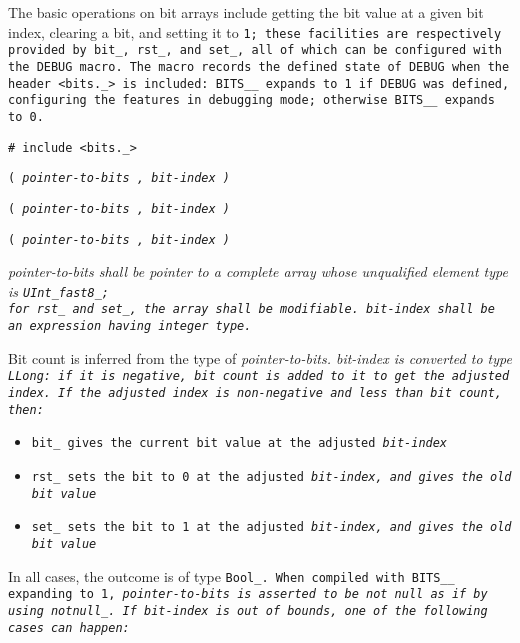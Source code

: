 The basic operations on bit arrays include getting the bit value
at a given bit index, clearing a bit, and setting it to \tt{1};
these facilities are respectively provided by \tt{bit_}, \tt{rst_},
and \tt{set_}, all of which can be configured with the \tt{DEBUG} macro.
The macro  records the \tt{defined} state of \tt{DEBUG}
when the header \tt{<bits._>} is included: \tt{BITS__} expands
to \tt{1} if \tt{DEBUG} was defined, configuring the features
in debugging mode; otherwise \tt{BITS__} expands to \tt{0}.


\tt{# include <bits._>}

 \tt{(} \it{pointer-to-bits} \tt{,} \it{bit-index} \tt{)}

 \tt{(} \it{pointer-to-bits} \tt{,} \it{bit-index} \tt{)}

 \tt{(} \it{pointer-to-bits} \tt{,} \it{bit-index} \tt{)}


\it{pointer-to-bits} shall be pointer to a complete array whose unqualified
element type is \tt{UInt_fast8_};\\for \tt{rst_} and \tt{set_}, the array shall be modifiable.
\it{bit-index} shall be an expression having integer type.


Bit count is inferred from the type of \it{pointer-to-bits}.
\it{bit-index} is converted to type \tt{LLong}:
if it is negative, bit count is added to it to get the adjusted index.
If the adjusted index is non-negative and less than bit count, then:

\begin{itemize}[nosep]

\item \tt{bit_} gives the current bit value at the adjusted \it{bit-index}

\item \tt{rst_} sets the bit to \tt{0} at the adjusted \it{bit-index},
and gives the old bit value

\item \tt{set_} sets the bit to \tt{1} at the adjusted \it{bit-index},
and gives the old bit value

\end{itemize}

In all cases, the outcome is of type \tt{Bool_}.
When compiled with \tt{BITS__} expanding to \tt{1},
\it{pointer-to-bits} is asserted to be not null as if by using \tt{notnull_}.
If \it{bit-index} is out of bounds, one of the following cases can happen:

